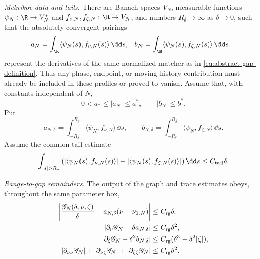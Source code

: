 \begin{theorem}
\smallskip
\noindent
\emph{Melnikov data and tails.}
There are Banach spaces \(V_N\), measurable functions
\(\psi_N:\R\to V_N^*\) and
\(f_{\nu,N},f_{\zeta,N}:\R\to V_N\), and numbers
\(R_\delta\to\infty\) as \(\delta\to0\), such that the absolutely
convergent pairings
\begin{align}
 a_N&=\int_{\R}\langle\psi_N(s),f_{\nu,N}(s)\rangle\,\dd s,
 &
 b_N&=\int_{\R}\langle\psi_N(s),f_{\zeta,N}(s)\rangle\,\dd s
 \label{eq:abstract-melnikov-coefficients}
\end{align}
represent the derivatives of the same normalized matcher as in
\cref{eq:abstract-gap-definition}.  Thus any phase, endpoint, or moving-history
contribution must already be included in these profiles or proved to vanish.
Assume that, with constants independent of \(N\),
\begin{equation}
 0<a_*\le |a_N|\le a^*,\qquad |b_N|\le b^*.
 \label{eq:abstract-coefficient-bounds}
\end{equation}
Put
\begin{equation}
 a_{N,\delta}=\int_{-R_\delta}^{R_\delta}
     \langle\psi_N,f_{\nu,N}\rangle\,\dd s,
 \qquad
 b_{N,\delta}=\int_{-R_\delta}^{R_\delta}
     \langle\psi_N,f_{\zeta,N}\rangle\,\dd s.
 \label{eq:abstract-truncated-coefficients}
\end{equation}
Assume the common tail estimate
\begin{equation}
 \int_{|s|>R_\delta}
 \left(
  |\langle\psi_N(s),f_{\nu,N}(s)\rangle|
  +|\langle\psi_N(s),f_{\zeta,N}(s)\rangle|
 \right)\dd s
 \le C_{\rm tail}\delta.
 \label{eq:abstract-tail-bound}
\end{equation}

\smallskip
\noindent
\emph{Range-to-gap remainders.}
The output of the graph and trace estimates obeys, throughout the same
parameter box,
\begin{align}
 \left|\frac{\mathscr G_N(\delta,\nu,\zeta)}{\delta}
       -a_{N,\delta}(\nu-\nu_{0,N})\right|
 &\le C_{\rm rg}\delta,
 \label{eq:abstract-gap-level}\\
 |\partial_\nu\mathscr G_N-\delta a_{N,\delta}|
 &\le C_{\rm rg}\delta^2,
 \label{eq:abstract-gap-slope}\\
 |\partial_\zeta\mathscr G_N-\delta^2b_{N,\delta}|
 &\le C_{\rm rg}(\delta^3+\delta^2|\zeta|),
 \label{eq:abstract-gap-response}\\
 |\partial_{\nu\nu}\mathscr G_N|
 +|\partial_{\nu\zeta}\mathscr G_N|
 +|\partial_{\zeta\zeta}\mathscr G_N|
 &\le C_{\rm rg}\delta^2.
 \label{eq:abstract-gap-second-jets}
\end{align}


\end{theorem}
